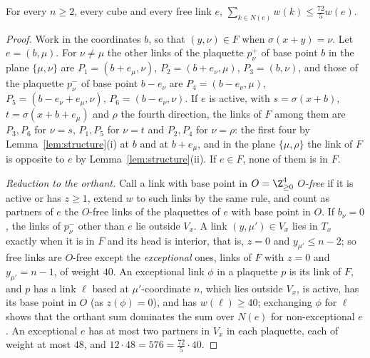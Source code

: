 \begin{proposition}\label{prop:weights}
For every $n\ge2$, every cube and every free link $e$,
$\sum_{k\in N(e)}w(k)\le\frac{72}5w(e)$.
\end{proposition}

\begin{proof}
Work in the coordinates $b$, so that $(y,\nu)\in F$ when $\sigma(x+y)=\nu$.
Let $e=(b,\mu)$. For $\nu\ne\mu$ the other links of the plaquette $p^+_\nu$ of
base point $b$ in the plane $\{\mu,\nu\}$ are $P_1=(b+e_\mu,\nu)$,
$P_2=(b+e_\nu,\mu)$, $P_3=(b,\nu)$, and those of the plaquette $p^-_\nu$ of base
point $b-e_\nu$ are $P_4=(b-e_\nu,\mu)$, $P_5=(b-e_\nu+e_\mu,\nu)$,
$P_6=(b-e_\nu,\nu)$. If $e$ is active, with $s=\sigma(x+b)$,
$t=\sigma(x+b+e_\mu)$ and $\rho$ the fourth direction, the links of $F$ among
them are $P_3,P_6$ for $\nu=s$, $P_1,P_5$ for $\nu=t$ and $P_2,P_4$ for
$\nu=\rho$: the first four by Lemma~\ref{lem:structure}(i) at $b$ and at
$b+e_\mu$, and in the plane $\{\mu,\rho\}$ the link of $F$ is opposite to $e$
by Lemma~\ref{lem:structure}(ii). If $e\in F$, none of them is in $F$.

\emph{Reduction to the orthant.} Call a link with base point in
$O=\Z^4_{\ge0}$ \emph{$O$-free} if it is active or has $z\ge1$, extend $w$ to
such links by the same rule, and count as partners of $e$ the $O$-free links
of the plaquettes of $e$ with base point in $O$. If $b_\nu=0$, the links of
$p^-_\nu$ other than $e$ lie outside $V_x$. A link $(y,\mu')\in V_x$ lies in
$T_x$ exactly when it is in $F$ and its head is interior, that is, $z=0$ and
$y_{\mu'}\le n-2$; so free links are $O$-free except the \emph{exceptional}
ones, links of $F$ with $z=0$ and $y_{\mu'}=n-1$, of weight $40$. An
exceptional link $\phi$ in a plaquette $p$ is its link of $F$, and $p$ has a
link $\ell$ based at $\mu'$-coordinate $n$, which lies outside $V_x$, is
active, has its base point in $O$ (as $z(\phi)=0$), and has $w(\ell)\ge40$;
exchanging $\phi$ for $\ell$ shows that the orthant sum dominates the sum over
$N(e)$ for non-exceptional $e$. An exceptional $e$ has at most two partners in
$V_x$ in each plaquette, each of weight at most $48$, and $12\cdot48=576=
\frac{72}5\cdot40$.


\end{proof}

